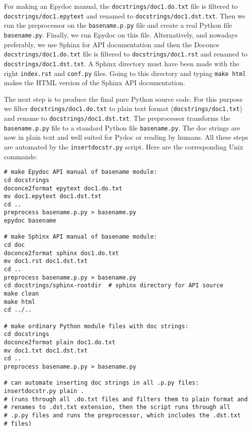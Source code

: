 \documentclass{article}
\begin{document}
For making an Epydoc manual, the {\fontsize{10pt}{10pt}\verb!docstrings/doc1.do.txt!} file is
filtered to {\fontsize{10pt}{10pt}\verb!docstrings/doc1.epytext!} and renamed to
{\fontsize{10pt}{10pt}\verb!docstrings/doc1.dst.txt!}.  Then we run the preprocessor on the
{\fontsize{10pt}{10pt}\verb!basename.p.py!} file and create a real Python file
{\fontsize{10pt}{10pt}\verb!basename.py!}. Finally, we run Epydoc on this file. Alternatively, and
nowadays preferably, we use Sphinx for API documentation and then the
Doconce {\fontsize{10pt}{10pt}\verb!docstrings/doc1.do.txt!} file is filtered to
{\fontsize{10pt}{10pt}\verb!docstrings/doc1.rst!} and renamed to {\fontsize{10pt}{10pt}\verb!docstrings/doc1.dst.txt!}. A
Sphinx directory must have been made with the right {\fontsize{10pt}{10pt}\verb!index.rst!} and
{\fontsize{10pt}{10pt}\verb!conf.py!} files. Going to this directory and typing {\fontsize{10pt}{10pt}\verb!make html!} makes
the HTML version of the Sphinx API documentation.

The next step is to produce the final pure Python source code. For
this purpose we filter {\fontsize{10pt}{10pt}\verb!docstrings/doc1.do.txt!} to plain text format
({\fontsize{10pt}{10pt}\verb!docstrings/doc1.txt!}) and rename to {\fontsize{10pt}{10pt}\verb!docstrings/doc1.dst.txt!}. The
preprocessor transforms the {\fontsize{10pt}{10pt}\verb!basename.p.py!} file to a standard Python
file {\fontsize{10pt}{10pt}\verb!basename.py!}. The doc strings are now in plain text and well
suited for Pydoc or reading by humans. All these steps are automated
by the {\fontsize{10pt}{10pt}\verb!insertdocstr.py!} script.  Here are the corresponding Unix
commands:
\begin{Verbatim}[fontsize=\fontsize{9pt}{9pt},tabsize=8,baselinestretch=0.85,
fontfamily=tt,xleftmargin=7mm]
# make Epydoc API manual of basename module:
cd docstrings
doconce2format epytext doc1.do.txt
mv doc1.epytext doc1.dst.txt
cd ..
preprocess basename.p.py > basename.py
epydoc basename

# make Sphinx API manual of basename module:
cd doc
doconce2format sphinx doc1.do.txt
mv doc1.rst doc1.dst.txt
cd ..
preprocess basename.p.py > basename.py
cd docstrings/sphinx-rootdir  # sphinx directory for API source
make clean
make html
cd ../..

# make ordinary Python module files with doc strings:
cd docstrings
doconce2format plain doc1.do.txt
mv doc1.txt doc1.dst.txt
cd ..
preprocess basename.p.py > basename.py

# can automate inserting doc strings in all .p.py files:
insertdocstr.py plain .
# (runs through all .do.txt files and filters them to plain format and
# renames to .dst.txt extension, then the script runs through all 
# .p.py files and runs the preprocessor, which includes the .dst.txt
# files)
\end{Verbatim}
\noindent
\end{document}
